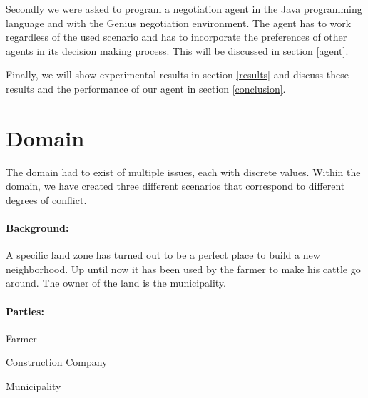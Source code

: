 \documentclass[a4,11pt]{scrartcl}
\let\tempone\itemize
\let\temptwo\enditemize
\renewenvironment{itemize}{\tempone\addtolength{\itemsep}{-0.5\baselineskip}}{\temptwo}
\begin{document}
    Secondly we were asked to program a negotiation agent in the Java 
    programming language and with the {\sc Genius} negotiation 
    environment. The agent has to work regardless of the used scenario 
    and has to incorporate the preferences of other agents in its 
    decision making process. This will be discussed in section 
    \ref{agent}.
    
    Finally, we will show experimental results in section \ref{results}
    and discuss these results and the performance of our agent in
    section \ref{conclusion}.


\section{Domain}\label{domain}

    The domain had to exist of multiple issues, each with discrete values.
    Within the domain, we have created three different scenarios that
    correspond to different degrees of conflict.
    
    \paragraph{Background:}
    A specific land zone has turned out to be a perfect place to build 
    a new neighborhood. Up until now it has been used by the farmer to 
    make his cattle go around. The owner of the land is the 
    municipality.

    \paragraph{Parties:}
    \begin{itemize}
        \item Farmer
        \item Construction Company
        \item Municipality
    \end{itemize}
\end{document}
